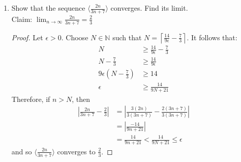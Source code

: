 \documentclass{article}
\theoremstyle{problem}
\theoremstyle{plain}
\theoremstyle{remark}
\newcommand{\ceil}[1] {
  \left\lceil #1 \right\rceil
}
\newcommand{\abs}[1] {
  \left| #1 \right|
}
\begin{document}
\begin{enumerate}
\item Show that the sequence $\langle \frac{2n}{3n+7} \rangle$ converges. Find its limit.\\
  Claim: $\displaystyle \lim_{n \to \infty} \frac{2n}{3n+7} = \frac{2}{3}$
  \begin{proof}
  Let $\epsilon > 0$. Choose $N \in \mathbb N$ such that $N = \displaystyle \ceil{\frac{14}{9\epsilon} - \frac{7}{3}}$. It follows that:
  \begin{align*}
    N &\geq \frac{14}{9\epsilon} - \frac{7}{3}\\
    N - \frac{7}{3} &\geq \frac{14}{9\epsilon}\\
    9\epsilon(N - \frac{7}{3}) &\geq 14\\
    \epsilon &\geq \frac{14}{9N + 21}
  \end{align*}
  Therefore, if $n > N$, then
  \begin{align*}
    \abs{\frac{2n}{3n+7} - \frac{2}{3}} &= \abs{\frac{3(2n)}{3(3n+7)} - \frac{2(3n+7)}{3(3n+7)}}\\
    &= \abs{\frac{-14}{9n+21}}\\
    &= \frac{14}{9n+21} < \frac{14}{9N + 21} \leq \epsilon
  \end{align*}
  and so $\langle \frac{2n}{3n+7} \rangle$ converges to $\displaystyle \frac{2}{3}$.
\end{proof}


\end{enumerate}
\end{document}
